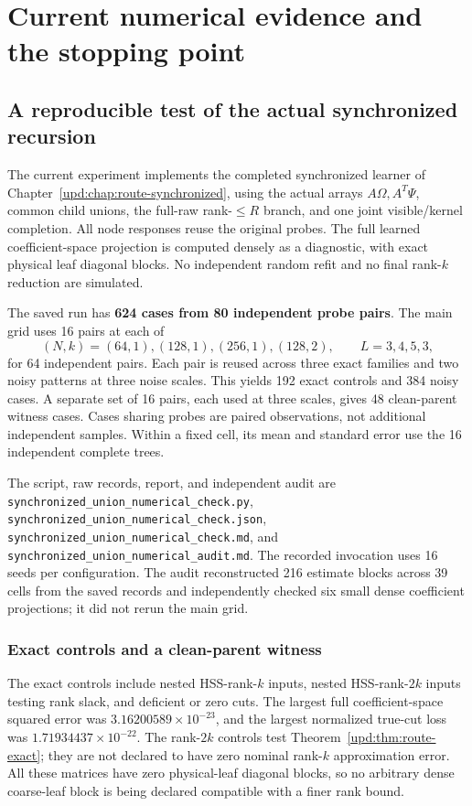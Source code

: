 \documentclass[11pt,oneside,openany,a4paper]{book}
\numberwithin{equation}{chapter}
\theoremstyle{definition}
\theoremstyle{remark}
\newcommand{\sourcefile}[1]{{\small\nolinkurl{#1}}}
\begin{document}
\chapter{Current numerical evidence and the stopping point}
\label{upd:chap:route-evidence}

\section{A reproducible test of the actual synchronized recursion}

The current experiment implements the completed synchronized learner
of Chapter~\ref{upd:chap:route-synchronized}, using the actual arrays
$A\Omega,A^T\Psi$, common child unions, the full-raw rank-$\leq R$
branch, and one joint visible/kernel completion.  All node responses
reuse the original probes.  The full learned coefficient-space
projection is computed densely as a diagnostic, with exact physical
leaf diagonal blocks.  No independent random refit and no final
rank-$k$ reduction are simulated.

The saved run has \textbf{624 cases from 80 independent probe pairs}.
The main grid uses 16 pairs at each of
\[
 (N,k)=(64,1),(128,1),(256,1),(128,2),
 \qquad L=3,4,5,3,
\]
for 64 independent pairs.  Each pair is reused across three exact
families and two noisy patterns at three noise scales.  This yields
192 exact controls and 384 noisy cases.  A separate set of 16 pairs,
each used at three scales, gives 48 clean-parent witness cases.
Cases sharing probes are paired observations, not additional
independent samples.  Within a fixed cell, its mean and standard error
use the 16 independent complete trees.

The script, raw records, report, and independent audit are
\sourcefile{synchronized_union_numerical_check.py},
\sourcefile{synchronized_union_numerical_check.json},
\sourcefile{synchronized_union_numerical_check.md}, and
\sourcefile{synchronized_union_numerical_audit.md}.  The recorded
invocation uses 16 seeds per configuration.  The audit reconstructed
216 estimate blocks across 39 cells from the saved records and
independently checked six small dense coefficient projections; it did
not rerun the main grid.

\subsection{Exact controls and a clean-parent witness}

The exact controls include nested HSS-rank-$k$ inputs, nested
HSS-rank-$2k$ inputs testing rank slack, and deficient or zero cuts.
The largest full coefficient-space squared error was
$3.16200589\times10^{-23}$, and the largest normalized true-cut loss
was $1.71934437\times10^{-22}$.  The rank-$2k$ controls test
Theorem~\ref{upd:thm:route-exact}; they are not declared to have zero
nominal rank-$k$ approximation error.  All these matrices have zero
physical-leaf diagonal blocks, so no arbitrary dense coarse-leaf block
is being declared compatible with a finer rank bound.
\end{document}
